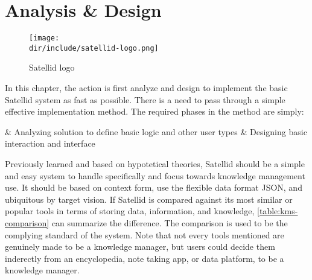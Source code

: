 \chapter{Analysis \& Design}
\label{chap:analysis-design}

\begin{figure}[ht]
  \centering
  \texttt{[image: \\dir/include/satellid-logo.png]}
  \caption{Satellid logo}
  \label{fig:satellid-logo}
\end{figure}

In this chapter, the action is first analyze and design to implement the basic Satellid system as fast as possible.
There is a need to pass through a simple effective implementation method.
The required phases in the method are simply:

\begin{easylist}
& Analyzing solution to define basic logic and other user types
& Designing basic interaction and interface
\end{easylist}

Previously learned and based on hypotetical theories, Satellid should be a simple and easy system to handle specifically and focus towards knowledge management use.
It should be based on context form, use the flexible data format \ac{JSON}, and ubiquitous by target vision.
If Satellid is compared against its most similar or popular tools in terms of storing data, information, and knowledge, \autoref{table:kms-comparison} can summarize the difference.
The comparison is used to be the complying standard of the system.
Note that not every tools mentioned are genuinely made to be a knowledge manager, but users could decide them inderectly from an encyclopedia, note taking app, or data platform, to be a knowledge manager.

